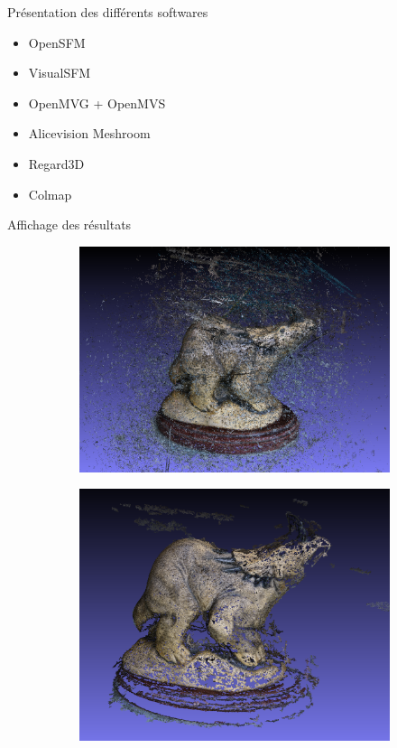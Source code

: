 Présentation des différents softwares
\begin{itemize}
    \item OpenSFM
    \item VisualSFM
    \item OpenMVG + OpenMVS
    \item Alicevision Meshroom
    \item Regard3D
    \item Colmap
\end{itemize}

Affichage des résultats


\begin{figure}[ht]
    \centering
    \begin{subfigure}{0.45\textwidth}
        \includegraphics[width=\linewidth]{datas/state_of_the_art/opensfm_result_dino.png}
        \caption{}
    \end{subfigure}
    \begin{subfigure}{0.45\textwidth}
        \includegraphics[width=\linewidth]{datas/state_of_the_art/visualsfm_result_dino.png}
        \caption{}
    \end{subfigure}


\end{figure}

